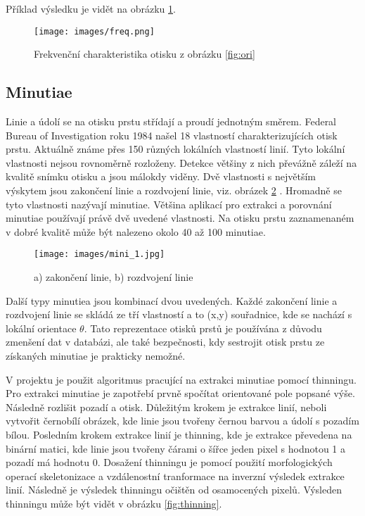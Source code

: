 \documentclass[a4paper,11pt]{article}
\begin{document}
\begin{multicols*}{2}
    Příklad výsledku je vidět na obrázku \ref{fig:freq}.
    \begin{figure}[H]
        \centering
            {\texttt{[image: images/freq.png]}}\\
            \caption{Frekvenční charakteristika otisku z obrázku \ref{fig:ori}}
            \label{fig:freq}
    \end{figure}
    \subsection{Minutiae}\label{miniatue}
        Linie a údolí se na otisku prstu střídají a proudí jednotným směrem. Federal Bureau of Investigation roku 1984 našel 18 vlastností charakterizujících otisk prstu. Aktuálně známe přes 150 různých lokálních vlastností linií. Tyto lokální vlastnosti nejsou rovnoměrně rozloženy. Detekce většiny z nich převážně záleží na kvalitě snímku otisku a jsou málokdy viděny. Dvě vlastnosti s největším výskytem jsou zakončení linie a rozdvojení linie, viz. obrázek \ref{fig:mini_1} \cite{mini_1}. Hromadně se tyto vlastnosti nazývají minutiae. Většina aplikací pro extrakci a porovnání minutiae používají právě dvě uvedené vlastnosti. Na otisku prstu zaznamenaném v dobré kvalitě může být nalezeno okolo 40 až 100 minutiae.
        
        \begin{figure}[H]
            \centering
                {\texttt{[image: images/mini\_1.jpg]}}\\
                \caption{a) zakončení linie, b) rozdvojení linie \cite{mini_1}}
                \label{fig:mini_1}
        \end{figure}
        
        Další typy minutiea jsou kombinací dvou uvedených. Každé zakončení linie a rozdvojení linie se skládá ze tří vlastností a to (x,y) souřadnice, kde se nachází s lokální orientace $\theta$. Tato reprezentace otisků prstů je používána z důvodu zmenšení dat v databázi, ale také bezpečnosti, kdy sestrojit otisk prstu ze získaných minutiae je prakticky nemožné.
        
        V projektu je použit algoritmus pracující na extrakci minutiae pomocí thinningu. Pro extrakci minutiae je zapotřebí prvně spočítat orientované pole popsané výše. Následně rozlišit pozadí a otisk. Důležitým krokem je extrakce linií, neboli vytvořit černobílí obrázek, kde linie jsou tvořeny černou barvou a údolí s pozadím bílou. Posledním krokem extrakce linií je thinning, kde je extrakce převedena na binární matici, kde linie jsou tvořeny čárami o šířce jeden pixel s hodnotou 1 a pozadí má hodnotu 0. Dosažení thinningu je pomocí použití morfologických operací skeletonizace a vzdálenostní tranformace na inverzní výsledek extrakce linií. Následně je výsledek thinningu očištěn od osamocených pixelů. Výsleden thinningu může být vidět v obrázku \ref{fig:thinning}.
        

\end{multicols*}
\end{document}
